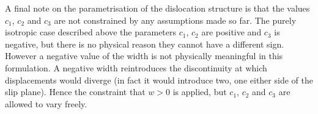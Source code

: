 A final note on the parametrisation of the dislocation structure is that the values $c_1$, $c_2$ and $c_3$ are not constrained by any assumptions made so far. The purely isotropic case described above the parameters $c_1$, $c_2$ are positive and $c_3$ is negative, but there is no physical reason they cannot have a different sign. However a negative value of the width is not physically meaningful in this formulation. A negative width reintroduces the discontinuity at which displacements would diverge (in fact it would introduce two, one either side of the slip plane). Hence the constraint that $w>0$ is applied, but $c_1$, $c_2$ and $c_3$ are allowed to vary freely.




























